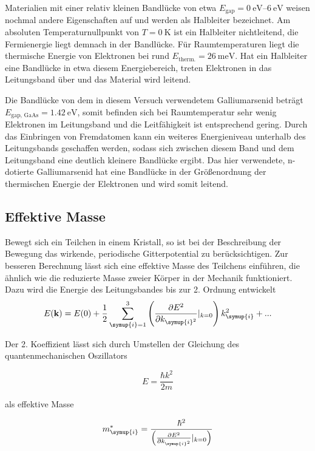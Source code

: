 Materialien mit einer relativ kleinen Bandlücke von etwa $E_{\text{gap}}=\qtyrange{0}{6}{\electronvolt}$ weisen nochmal andere Eigenschaften auf und werden als Halbleiter
bezeichnet. Am absoluten Temperaturnullpunkt von $T=\qty{0}{\kelvin}$ ist ein Halbleiter nichtleitend, die Fermienergie liegt demnach in der Bandlücke. Für Raumtemperaturen liegt die
thermische Energie von Elektronen bei rund $E_{\text{therm.}}=\qty{26}{\milli\electronvolt}$. Hat ein Halbleiter eine Bandlücke in etwa diesem Energiebereich, treten Elektronen in das 
Leitungsband über und das Material wird leitend.

Die Bandlücke von dem in diesem Versuch verwendetem Galliumarsenid beträgt $E_{\text{gap, GaAs}} = \qty{1,42}{\electronvolt}$, somit befinden sich bei Raumtemperatur sehr wenig 
Elektronen im Leitungsband und die Leitfähigkeit ist entsprechend gering. Durch das Einbringen von Fremdatomen kann ein weiteres Energieniveau unterhalb des Leitungsbands geschaffen werden,
sodass sich zwischen diesem Band und dem Leitungsband eine deutlich kleinere Bandlücke ergibt. Das hier verwendete, n-dotierte Galliumarsenid hat eine Bandlücke in der Größenordnung der
thermischen Energie der Elektronen und wird somit leitend. 

\subsection{Effektive Masse}
\label{subsec:Effektive Masse}
Bewegt sich ein Teilchen in einem Kristall, so ist bei der Beschreibung der Bewegung das wirkende, periodische Gitterpotential zu berücksichtigen. Zur besseren Berechnung lässt
sich eine effektive Masse des Teilchens einführen, die ähnlich wie die reduzierte Masse zweier Körper in der Mechanik funktioniert.
Dazu wird die Energie des Leitungsbandes bis zur 2. Ordnung entwickelt
\begin{equation*}
    E(\mathbf{k}) = E(0) + \frac{1}{2}\sum_{\symup{i}=1}^{3}\left(\frac{\partial E^2}{\partial k_{\symup{i}^2}}|_{k=0}\right) k_{\symup{i}}^2 + ...
\end{equation*}

Der 2. Koeffizient lässt sich durch Umstellen der Gleichung des quantenmechanischen Oszillators 

\begin{equation*}
    E = \frac{\hbar k^2}{2m}
\end{equation*}

als effektive Masse

\begin{equation*}
    m_{\symup{i}}^{*}=\frac{\hbar^2}{\left(\frac{\partial E^2}{\partial k_{\symup{i}^2}}|_{k=0}\right)}
\end{equation*}

